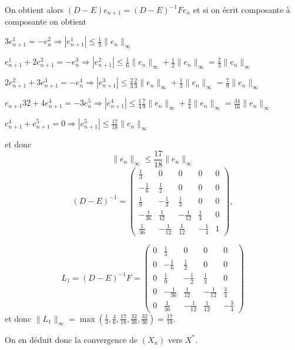 {\begin{enumerate}
{On obtient alors $(D-E)e_{n+1}=(D-E)^{-1}Fe_n$ et si on \'ecrit composante \`a
composante on obtient

$3e_{n+1}^1=-e_n^2\Rightarrow  |e_{n+1}^1|\leq \frac{1}{3}\|e_n\|_{\infty}$

$e_{n+1}^1+2e_{n+1}^2=-e_n^3 \Rightarrow |e_{n+1}^2| \leq \frac{1}{6}\|e_n\|_\infty +\frac{1}{2}\|e_n\|_\infty=\frac{2}{3}\|e_n\|_\infty$

$2e_{n+1}^2 +3e_{n+1}^3=-e_n^4\Rightarrow |e_{n+1}^3|\leq \frac{2}{3}\frac{2}{3}\|e_n\|_\infty + \frac{1}{3}\|e_n\|_\infty=\frac{7}{9}\|e_n\|_\infty$

$e_{n+1}32 +4e_{n+1}^4=-3e_n^5\Rightarrow |e_{n+1}^4|\leq \frac{1}{4} \frac{7}{9}\|e_n\|_\infty + \frac{3}{4}\|e_n\|_\infty=\frac{34}{16} \|e_n\|_\infty$

$e_{n+1}^4+e_{n+1}^5=0\Rightarrow |e_{n+1}^5|\leq \frac{17}{18}\|e_n\|_\infty$

et donc
$$\|e_n\|_\infty\leq \frac{17}{18}\|e_n\|_\infty$$
$$(D-E)^{-1}=\left(\begin{array}{ccccc}
\frac{1}{3}&0&0&0&0\\
-\frac{1}{6}& \frac{1}{2}&0&0&0\\
\frac{1}{9}&-\frac{1}{3}&\frac{1}{3}&0&0\\
-\frac{1}{36}&\frac{1}{12}&-\frac{1}{12}&\frac{1}{4}&0\\
\frac{1}{36}&-\frac{1}{12}&\frac{1}{12}&-\frac{1}{4}&1
\end{array}\right),$$

$$L_1=(D-E)^{-1}F=\left(\begin{array}{ccccc}
0&\frac{1}{3}&0&0&0\\
0&-\frac{1}{6}& \frac{1}{2}&0&0\\
0&\frac{1}{9}&-\frac{1}{2}&\frac{1}{3}&0\\
0&-\frac{1}{36}&\frac{1}{12}&-\frac{1}{12}&\frac{3}{4}\\
0&\frac{1}{36}&-\frac{1}{12}&\frac{1}{12}&-\frac{3}{4}
\end{array}\right)$$
et donc $\|L_1\|_\infty=\max (\frac{1}{3},\frac{4}{6},\frac{17}{18},\frac{32}{36},\frac{32}{36})=\frac{17}{18}$.

On en d\'eduit donc la convergence de $(X_n)$ vers $X^*$.
}
\end{enumerate}
}

